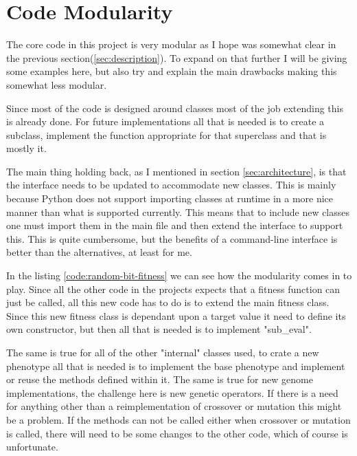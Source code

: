 \section{Code Modularity}\label{sec:modularity}
The core code in this project is very modular as I hope was somewhat clear in
the previous section(\ref{sec:description}). To expand on that further I will be
giving some examples here, but also try and explain the main drawbacks making
this somewhat less modular.

Since most of the code is designed around classes most of the job extending this
is already done. For future implementations all that is needed is to create a
subclass, implement the function appropriate for that superclass and that is
mostly it.

The main thing holding back, as I mentioned in section \ref{sec:architecture},
is that the interface needs to be updated to accommodate new classes. This is
mainly because Python does not support importing classes at runtime in a more
nice manner than what is supported currently. This means that to include new
classes one must import them in the main file and then extend the interface to
support this. This is quite cumbersome, but the benefits of a command-line
interface is better than the alternatives, at least for me.

In the listing \ref{code:random-bit-fitness} we can see how the modularity comes
in to play. Since all the other code in the projects expects that a fitness
function can just be called, all this new code has to do is to extend the main
fitness class. Since this new fitness class is dependant upon a target value it
need to define its own constructor, but then all that is needed is to implement
"sub\_eval".



The same is true for all of the other "internal" classes used, to crate a new
phenotype all that is needed is to implement the base phenotype and implement or
reuse the methods defined within it. The same is true for new genome
implementations, the challenge here is new genetic operators. If there is a need
for anything other than a reimplementation of crossover or mutation this might
be a problem. If the methods can not be called either when crossover or mutation
is called, there will need to be some changes to the other code, which of course
is unfortunate.
